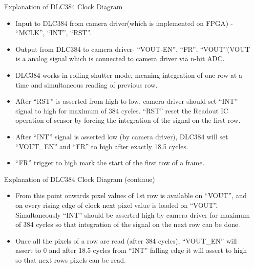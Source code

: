 \documentclass{beamer}
\begin{document}
\begin{frame}{Explanation of DLC384 Clock Diagram}
    \begin{itemize}
        \item Input to DLC384 from camera driver(which is implemented on FPGA) - “MCLK”, “INT”, “RST”.
        \item Output from DLC384 to camera driver- “VOUT-EN”, “FR”, “VOUT”(VOUT is a analog signal which is connected to camera driver  via n-bit ADC.
        \item DLC384 works in rolling shutter mode, meaning integration of one row at a time and simultaneous reading of previous row.
        \item After “RST” is asserted from high to low, camera driver should set “INT” signal to high for maximum of  384 cycles. “RST” reset the Readout IC operation of sensor by forcing the integration of the signal on the first row.
        \item After “INT” signal is asserted low (by camera driver), DLC384 will set “VOUT\_EN” and “FR” to high after exactly 18.5 cycles.
        \item “FR” trigger to high mark the start of the first row of a frame.
    \end{itemize}
\end{frame}


\begin{frame}{Explanation of DLC384 Clock Diagram (continue)}
    \begin{itemize}

        \item From this point onwards pixel values of 1st row is available on “VOUT”, and on every rising edge of clock next pixel value is loaded on “VOUT”. Simultaneously “INT” should be asserted high by camera driver for maximum of 384 cycles so that integration of the signal on the next row can be done.
        \item Once all the pixels of a row are read (after 384 cycles), “VOUT\_EN” will assert to 0 and after 18.5 cycles from “INT” falling edge it will assert to high so that next rows pixels can be read.
    \end{itemize}
\end{frame}
\end{document}
